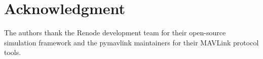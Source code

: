 \documentclass[conference,a4paper]{IEEEtran}
\begin{document}
\section*{Acknowledgment}

The authors thank the Renode development team for their open-source simulation framework and the pymavlink maintainers for their MAVLink protocol tools.

\balance


\end{document}
